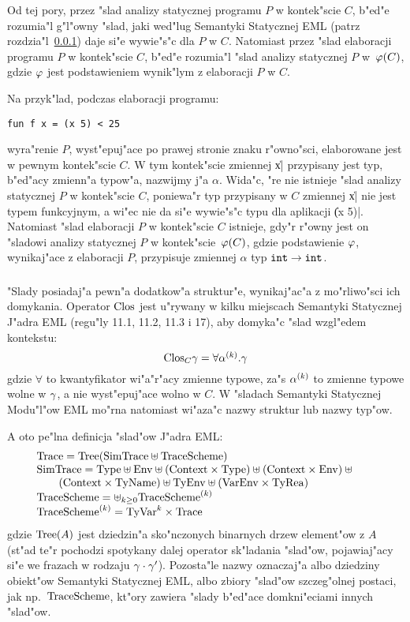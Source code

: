 Od tej pory, przez "slad analizy statycznej programu $P$ w kontek"scie $C$, b"ed"e
rozumia"l g"l"owny "slad, jaki wed"lug Semantyki Statycznej EML 
(patrz rozdzia"l~\ref{sec:tracedef}) daje si"e wywie"s"c dla $P$ w $C$.
Natomiast przez "slad elaboracji programu $P$ w kontek"scie $C$, b"ed"e
rozumia"l "slad analizy statycznej $P$ w~$\varphi(C)$, gdzie $\varphi$ jest
podstawieniem wynik"lym z elaboracji $P$ w $C$.

Na przyk"lad, podczas elaboracji programu:
\begin{verbatim}
fun f x = (x 5) < 25
\end{verbatim}
wyra"renie $P$, wyst"epuj"ace po prawej stronie znaku r"owno"sci, 
elaborowane jest w pewnym kontek"scie $C$. W tym kontek"scie zmiennej \|x| przypisany jest typ, 
b"ed"acy zmienn"a typow"a, nazwijmy j"a $\alpha$.
Wida"c, "re nie istnieje "slad analizy statycznej $P$ w kontek"scie $C$,
poniewa"r typ przypisany w $C$ zmiennej \|x| nie jest typem funkcyjnym,
a wi"ec nie da si"e wywie"s"c typu dla aplikacji \|(x 5)|.
Natomiast "slad elaboracji $P$ w kontek"scie $C$ istnieje,
gdy"r r"owny jest on "sladowi analizy statycznej $P$ w kontek"scie~$\varphi(C)$,
gdzie podstawienie $\varphi$, wynikaj"ace z elaboracji $P$, 
przypisuje zmiennej $\alpha$ typ $\mbox{\tt int}\rightarrow\mbox{\tt int}$.

\subsubsection{\sectracedef}
\label{sec:tracedef}

"Slady posiadaj"a pewn"a dodatkow"a struktur"e, wynikaj"ac"a z mo"rliwo"sci ich domykania.
Operator ${\rm Clos}$ jest u"rywany w kilku miejscach Semantyki Statycznej J"adra EML
(regu"ly 11.1, 11.2, 11.3 i 17), aby domyka"c "slad wzgl"edem kontekstu:
$${\rm Clos}_{C}\gamma=\forall\mbox{$\alpha^{(k)}$}.\gamma$$
gdzie $\forall$ to kwantyfikator wi"a"r"acy zmienne typowe, 
za"s $\mbox{$\alpha^{(k)}$}$ to zmienne typowe wolne w $\gamma$, a nie wyst"epuj"ace wolno w $C$.
W "sladach Semantyki Statycznej Modu"l"ow EML mo"rna natomiast wi"aza"c 
nazwy struktur lub nazwy typ"ow.

A oto pe"lna definicja "slad"ow J"adra EML:
\begin{displaymath}
\begin{array}{l}
\Trace = \Tree{\mbox{\SimTrace} \uplus\TraceScheme}\\
\SimTrace = \Type\uplus\Env\uplus(\Context\times\Type)\uplus(\Context\times\Env)\uplus\phantom{\Env}\\
\qquad (\Context\times\TyNames)\uplus\TyEnv\uplus(\VarEnv\times\TyRea)\\
\TraceScheme = \uplus_{k\geq 0} \TraceScheme^{(k)}\\
\TraceScheme^{(k)}=\mbox{TyVar}^k\times\Trace
\end{array}
\end{displaymath} 
gdzie $\mbox{Tree}(A)$ jest dziedzin"a sko"nczonych binarnych drzew element"ow z $A$
(st"ad te"r pochodzi spotykany dalej operator sk"ladania "slad"ow,
pojawiaj"acy si"e we frazach w rodzaju $\gamma\cdot \gamma'$).
Pozosta"le nazwy oznaczaj"a albo dziedziny obiekt"ow Semantyki Statycznej EML,
albo zbiory "slad"ow szcze\-g"ol\-nej postaci, jak np.\ $\mbox{TraceScheme}$,
kt"ory zawiera "slady b"ed"ace domkni"eciami innych "slad"ow.

